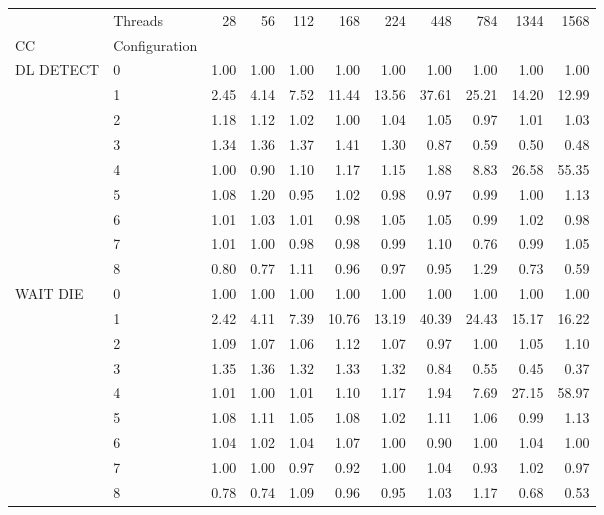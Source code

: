 \begin{tabular}{llrrrrrrrrr}
\toprule
       & Threads &  28   &  56   &  112  &  168  &  224  &   448  &   784  &   1344 &   1568 \\
CC & Configuration &       &       &       &       &       &        &        &        &        \\
\midrule
DL DETECT & 0 &  1.00 &  1.00 &  1.00 &  1.00 &  1.00 &   1.00 &   1.00 &   1.00 &   1.00 \\
       & 1 &  2.45 &  4.14 &  7.52 & 11.44 & 13.56 &  37.61 &  25.21 &  14.20 &  12.99 \\
       & 2 &  1.18 &  1.12 &  1.02 &  1.00 &  1.04 &   1.05 &   0.97 &   1.01 &   1.03 \\
       & 3 &  1.34 &  1.36 &  1.37 &  1.41 &  1.30 &   0.87 &   0.59 &   0.50 &   0.48 \\
       & 4 &  1.00 &  0.90 &  1.10 &  1.17 &  1.15 &   1.88 &   8.83 &  26.58 &  55.35 \\
       & 5 &  1.08 &  1.20 &  0.95 &  1.02 &  0.98 &   0.97 &   0.99 &   1.00 &   1.13 \\
       & 6 &  1.01 &  1.03 &  1.01 &  0.98 &  1.05 &   1.05 &   0.99 &   1.02 &   0.98 \\
       & 7 &  1.01 &  1.00 &  0.98 &  0.98 &  0.99 &   1.10 &   0.76 &   0.99 &   1.05 \\
       & 8 &  0.80 &  0.77 &  1.11 &  0.96 &  0.97 &   0.95 &   1.29 &   0.73 &   0.59 \\
WAIT DIE & 0 &  1.00 &  1.00 &  1.00 &  1.00 &  1.00 &   1.00 &   1.00 &   1.00 &   1.00 \\
       & 1 &  2.42 &  4.11 &  7.39 & 10.76 & 13.19 &  40.39 &  24.43 &  15.17 &  16.22 \\
       & 2 &  1.09 &  1.07 &  1.06 &  1.12 &  1.07 &   0.97 &   1.00 &   1.05 &   1.10 \\
       & 3 &  1.35 &  1.36 &  1.32 &  1.33 &  1.32 &   0.84 &   0.55 &   0.45 &   0.37 \\
       & 4 &  1.01 &  1.00 &  1.01 &  1.10 &  1.17 &   1.94 &   7.69 &  27.15 &  58.97 \\
       & 5 &  1.08 &  1.11 &  1.05 &  1.08 &  1.02 &   1.11 &   1.06 &   0.99 &   1.13 \\
       & 6 &  1.04 &  1.02 &  1.04 &  1.07 &  1.00 &   0.90 &   1.00 &   1.04 &   1.00 \\
       & 7 &  1.00 &  1.00 &  0.97 &  0.92 &  1.00 &   1.04 &   0.93 &   1.02 &   0.97 \\
       & 8 &  0.78 &  0.74 &  1.09 &  0.96 &  0.95 &   1.03 &   1.17 &   0.68 &   0.53 \\

\end{tabular}

